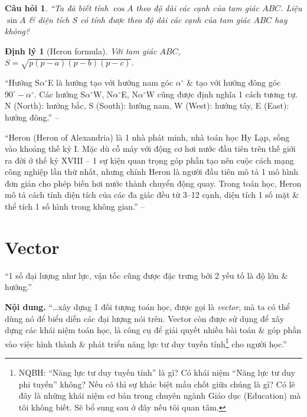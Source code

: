 \documentclass{article}
\numberwithin{equation}{section}
\newtheorem{theorem}{Định lý}[section]
\newtheorem{question}{Câu hỏi}[section]
\begin{document}
\begin{question}
	``Ta đã biết tính $\cos A$ theo độ dài các cạnh của tam giác $ABC$. Liệu $\sin A$ \& diện tích $S$ có tính được theo độ dài các cạnh của tam giác $ABC$ hay không?
\end{question}

\begin{theorem}[Heron formula]
	Với tam giác $ABC$, $S = \sqrt{p(p - a)(p - b)(p - c)}$.
\end{theorem}
``Hướng S$\alpha^\circ$E là hướng tạo với hướng nam góc $\alpha^\circ$ \& tạo với hướng đông góc $90^\circ - \alpha^\circ$. Các hướng S$\alpha^\circ$W, N$\alpha^\circ$E, N$\alpha^\circ$W cũng được định nghĩa 1 cách tương tự. N (North): hướng bắc, S (South): hướng nam, W (West): hướng tây, E (East): hướng đông.'' -- \cite[p. 42]{Khoai_Anh_Tan_Thang_Anh_Cuong_Duong_Dang_Ha_Hanh_Hong_Son_Tuan_Vuong_Toan_10_tap_1}

``Heron (Heron of Alexandria) là 1 nhà phát minh, nhà toán học Hy Lạp, sống vào khoảng thế kỷ I. Mặc dù cỗ máy với động cơ hơi nước đầu tiên trên thế giới ra đời ở thế kỷ XVIII -- 1 sự kiện quan trọng góp phần tạo nên cuộc cách mạng công nghiệp lần thứ nhất, nhưng chính Heron là người đầu tiên mô tả 1 mô hình đơn giản cho phép biến hơi nước thành chuyển động quay. Trong toán học, Heron mô tả cách tính diện tích của các đa giác đều từ 3--12 cạnh, diện tích 1 số mặt \& thể tích 1 số hình trong không gian.'' -- \cite[p. 43]{Khoai_Anh_Tan_Thang_Anh_Cuong_Duong_Dang_Ha_Hanh_Hong_Son_Tuan_Vuong_Toan_10_tap_1}


\section{Vector}
``1 số đại lượng như lực, vận tốc cũng được đặc trưng bởi 2 yếu tố là độ lớn \& hướng.''

\noindent\textbf{Nội dung.} ``\ldots xây dựng 1 đối tượng toán học, được gọi là \textit{vector}, mà ta có thể dùng nó để biểu diễn các đại lượng nói trên. Vector còn được sử dụng để xây dựng các khái niệm toán học, là công cụ để giải quyết nhiều bài toán \& góp phần vào việc hình thành \& phát triển năng lực tư duy tuyến tính\footnote{NQBH: ``Năng lực tư duy tuyến tính'' là gì? Có khái niệm ``Năng lực tư duy phi tuyến'' không? Nếu có thì sự khác biệt mấu chốt giữa chúng là gì? Có lẽ đây là những khái niệm cơ bản trong chuyên ngành Giáo dục (Education) mà tôi không biết. Sẽ bổ sung sau ở đây nếu tôi quan tâm.} cho người học.''
\end{document}
